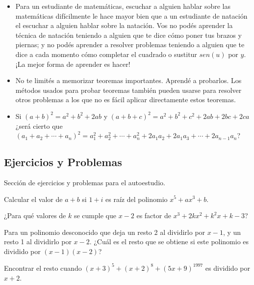 \begin{itemize}
    \item Para un estudiante de matemáticas, escuchar a alguien hablar sobre las matemáticas difícilmente le hace mayor bien que a un estudiante de natación el escuchar a alguien hablar sobre la natación.
    Vos no podés aprender la técnica de natación teniendo a alguien que te dice cómo poner tus brazos y piernas; y no podés aprender a resolver problemas teniendo a alguien que te dice a cada momento cómo completar el cuadrado o sustitur $sen(u)$ por $y$.
    ¡La mejor forma de aprender es hacer!
    \item No te limités a memorizar teoremas importantes.
    Aprendé a probarlos. Los métodos usados para probar teoremas también pueden usarse para resolver otros problemas a los que no es fácil aplicar directamente estos teoremas.
    \item Si $(a + b)^2 = a^2 + b^2 + 2ab$ y $(a + b + c)^2 = a^2 + b^2 + c^2 + 2ab + 2bc + 2ca$ ¿será cierto que $(a_1 + a_2 + \cdots + a_n)^2 = a_1^2 + a_2^2 + \cdots + a_n^2 + 2a_1 a_2 + 2a_1 a_3 + \cdots + 2a_{n-1}a_n$?
\end{itemize}



\subsection{Ejercicios y Problemas}

Sección de ejercicios y problemas para el autoestudio.

\begin{section-problem}
    Calcular el valor de $a + b$ si $1 + i$ es raíz del polinomio $x^5 + ax^3 + b$.
\end{section-problem}

\begin{section-problem}
    ¿Para qué valores de $k$ se cumple que $x - 2$ es factor de $x^3 + 2kx^2 + k^2 x + k - 3$?
\end{section-problem}

\begin{section-problem}
    Para un polinomio desconocido que deja un resto 2 al dividirlo por $x - 1$, y un resto 1 al dividirlo por $x - 2$.
    ¿Cuál es el resto que se obtiene si este polinomio es dividido por $(x - 1)(x - 2)$?
\end{section-problem}

\begin{section-problem}
    Encontrar el resto cuando $(x + 3)^5 + (x + 2)^8 + (5x + 9)^{1997}$ es dividido por $x + 2$.
\end{section-problem}


